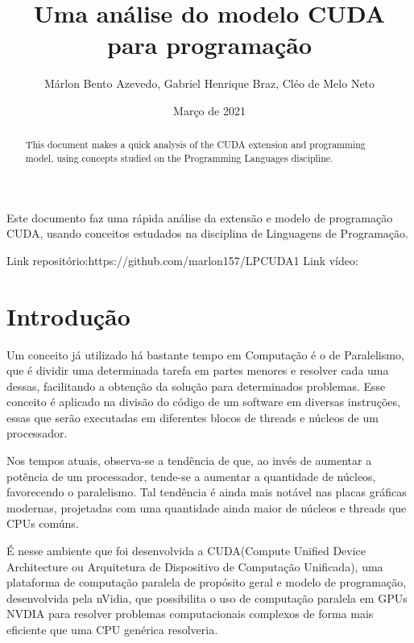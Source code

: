 \documentclass[12pt]{article}
\title{Uma análise do modelo CUDA para programação}
\author{Márlon Bento Azevedo, Gabriel Henrique Braz, Cléo de Melo Neto}
\date{Março de 2021}
\begin{document}
 

\maketitle

\begin{abstract}
  This document makes a quick analysis of the CUDA extension and programming model, using concepts studied on the Programming Languages discipline.
\end{abstract}
     
\begin{resumo} 
  Este documento faz uma rápida análise da extensão e modelo de programação CUDA, usando conceitos estudados na disciplina de Linguagens de Programação.
\end{resumo}

\begin{center}
    Link repositório:https://github.com/marlon157/LPCUDA1
    Link vídeo:
\end{center}


\section{Introdução}
\label{sec:intro}
Um conceito já utilizado há bastante tempo em Computação é o de Paralelismo, que é dividir uma determinada tarefa em partes menores e resolver cada uma dessas, facilitando a obtenção da solução para determinados problemas. Esse conceito é aplicado na divisão do código de um software em diversas instruções, essas que serão executadas em diferentes blocos de threads e núcleos de um processador.

Nos tempos atuais, observa-se a tendência de que, ao invés de aumentar a potência de um processador, tende-se a aumentar a quantidade de núcleos, favorecendo o paralelismo. Tal tendência é ainda mais notável nas placas gráficas modernas, projetadas com uma quantidade ainda maior de núcleos e threads que CPUs comúns.

É nesse ambiente que foi desenvolvida a CUDA(Compute Unified Device Architecture ou Arquitetura de Dispositivo de Computação Unificada), uma plataforma de computação paralela de propósito geral e modelo de programação, desenvolvida pela nVidia, que possibilita o uso de computação paralela em GPUs NVDIA para resolver problemas computacionais complexos de forma mais eficiente que uma CPU genérica resolveria.
\end{document}
